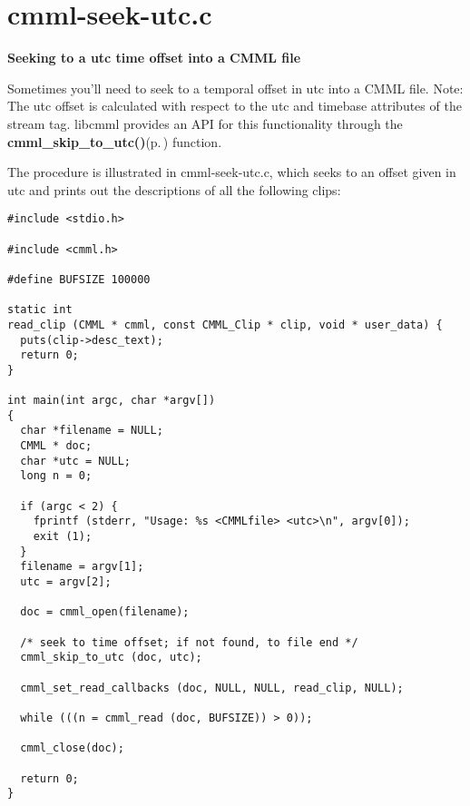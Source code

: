 \section{cmml-seek-utc.c}
{\bf Seeking to a utc time offset into a CMML file}

Sometimes you'll need to seek to a temporal offset in utc into a CMML file. Note: The utc offset is calculated with respect to the utc and timebase attributes of the stream tag. libcmml provides an API for this functionality through the {\bf cmml\_\-skip\_\-to\_\-utc()}{\rm (p.\,\pageref{cmml_8h_a53})} function.

The procedure is illustrated in cmml-seek-utc.c, which seeks to an offset given in utc and prints out the descriptions of all the following clips: 

\footnotesize\begin{verbatim}
#include <stdio.h>

#include <cmml.h>

#define BUFSIZE 100000

static int
read_clip (CMML * cmml, const CMML_Clip * clip, void * user_data) {
  puts(clip->desc_text);
  return 0;
}

int main(int argc, char *argv[])
{
  char *filename = NULL;
  CMML * doc;
  char *utc = NULL;
  long n = 0;

  if (argc < 2) {
    fprintf (stderr, "Usage: %s <CMMLfile> <utc>\n", argv[0]);
    exit (1);
  }
  filename = argv[1];
  utc = argv[2];

  doc = cmml_open(filename);
 
  /* seek to time offset; if not found, to file end */
  cmml_skip_to_utc (doc, utc);

  cmml_set_read_callbacks (doc, NULL, NULL, read_clip, NULL);
 
  while (((n = cmml_read (doc, BUFSIZE)) > 0));
   
  cmml_close(doc);

  return 0;
}
\end{verbatim}
\normalsize
 
